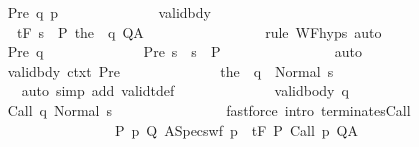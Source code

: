 \begin{isabellebody}
\ \ \ \ \ \ \ \ \ \ \ \ \isamarkupfalse%
\ Pre\ q\ {\isasymtau}p\isanewline
\ \ \ \ \ \ \ \ \ \ \ \ \isamarkupfalse%
\ valid{\isacharunderscore}bdy{\isacharcolon}\ \isanewline
\ \ \ \ \ \ \ \ \ \ \ \ \ \ {\isachardoublequoteopen}{\isasymGamma}\ {\isasymTurnstile}\isactrlsub t\isactrlbsub {\isacharslash}F\isactrlesub \ {\isacharparenleft}{\isacharbraceleft}s{\isacharbraceright}\ {\isasyminter}\ P{\isacharprime}{\isacharparenright}\ {\isacharparenleft}the\ {\isacharparenleft}{\isasymGamma}\ q{\isacharparenright}{\isacharparenright}\ Q{\isacharprime}{\isacharcomma}A{\isacharprime}{\isachardoublequoteclose}\isanewline
\ \ \ \ \ \ \ \ \ \ \ \ \ \ \isamarkupfalse%
\ {\isacharminus}\ {\isacharparenleft}rule\ WF{\isachardot}hyps{\isacharcomma}\ auto{\isacharparenright}\isanewline
\ \ \ \ \ \ \ \ \ \ \ \ \isamarkupfalse%
\ Pre\ q\isanewline
\ \ \ \ \ \ \ \ \ \ \ \ \isamarkupfalse%
\ Pre{\isacharprime}{\isacharcolon}\ {\isachardoublequoteopen}s\ {\isasymin}\ {\isacharbraceleft}s{\isacharbraceright}\ {\isasyminter}\ P{\isacharprime}{\isachardoublequoteclose}\isanewline
\ \ \ \ \ \ \ \ \ \ \ \ \ \ \isamarkupfalse%
\ auto\isanewline
\ \ \ \ \ \ \ \ \ \ \ \ \isamarkupfalse%
\ valid{\isacharunderscore}bdy\ ctxt\ Pre{\isacharprime}\isanewline
\ \ \ \ \ \ \ \ \ \ \ \ \isamarkupfalse%
\ {\isachardoublequoteopen}{\isasymGamma}{\isasymturnstile}the\ {\isacharparenleft}{\isasymGamma}\ q{\isacharparenright}\ {\isasymdown}\ Normal\ s{\isachardoublequoteclose}\isanewline
\ \ \ \ \ \ \ \ \ \ \ \ \ \ \isamarkupfalse%
\ {\isacharparenleft}auto\ simp\ add{\isacharcolon}\ validt{\isacharunderscore}def{\isacharparenright}\isanewline
\ \ \ \ \ \ \ \ \ \ \ \ \isamarkupfalse%
\ valid{\isacharunderscore}body\ q\ \isanewline
\ \ \ \ \ \ \ \ \ \ \ \ \isamarkupfalse%
\ {\isachardoublequoteopen}{\isasymGamma}{\isasymturnstile}Call\ q{\isasymdown}\ Normal\ s{\isachardoublequoteclose}\isanewline
\ \ \ \ \ \ \ \ \ \ \ \ \ \ \isamarkupfalse%
\ {\isacharparenleft}fastforce\ intro{\isacharcolon}\ terminates{\isachardot}Call{\isacharparenright}\isanewline
\ \ \ \ \ \ \ \ \ \ \isamarkupfalse%
\isanewline
\ \ \ \ \ \ \ \ \isacommand{{\isacharbraceright}}\isamarkupfalse%
\isanewline
\ \ \ \ \ \ \ \ \isamarkupfalse%
\ {\isachardoublequoteopen}{\isasymforall}{\isacharparenleft}P{\isacharcomma}\ p{\isacharcomma}\ Q{\isacharcomma}\ A{\isacharparenright}{\isasymin}Specs{\isacharunderscore}wf\ p\ {\isasymtau}{\isachardot}\ {\isasymGamma}{\isasymTurnstile}\isactrlsub t\isactrlbsub {\isacharslash}F\isactrlesub \ P\ Call\ p\ Q{\isacharcomma}A{\isachardoublequoteclose}\isanewline

\end{isabellebody}
